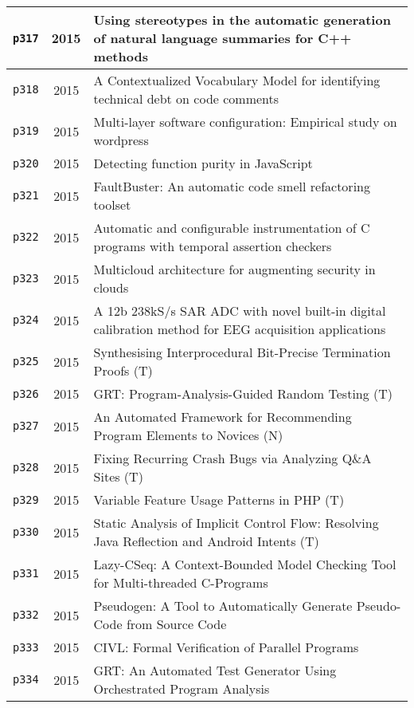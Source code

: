 \begin{longtable}{| c | c | p{16cm} |}
  \texttt{p317} & 2015 & Using stereotypes in the automatic generation of natural language summaries for C++ methods \\
  \hline
  \texttt{p318} & 2015 & A Contextualized Vocabulary Model for identifying technical debt on code comments \\
  \hline
  \texttt{p319} & 2015 & Multi-layer software configuration: Empirical study on wordpress \\
  \hline
  \texttt{p320} & 2015 & Detecting function purity in JavaScript \\
  \hline
  \texttt{p321} & 2015 & FaultBuster: An automatic code smell refactoring toolset \\
  \hline
  \texttt{p322} & 2015 & Automatic and configurable instrumentation of C programs with temporal assertion checkers \\
  \hline
  \texttt{p323} & 2015 & Multicloud architecture for augmenting security in clouds \\
  \hline
  \texttt{p324} & 2015 & A 12b 238kS/s SAR ADC with novel built-in digital calibration method for EEG acquisition applications \\
  \hline
  \texttt{p325} & 2015 & Synthesising Interprocedural Bit-Precise Termination Proofs (T) \\
  \hline
  \texttt{p326} & 2015 & GRT: Program-Analysis-Guided Random Testing (T) \\
  \hline
  \texttt{p327} & 2015 & An Automated Framework for Recommending Program Elements to Novices (N) \\
  \hline
  \texttt{p328} & 2015 & Fixing Recurring Crash Bugs via Analyzing Q\&A Sites (T) \\
  \hline
  \texttt{p329} & 2015 & Variable Feature Usage Patterns in PHP (T) \\
  \hline
  \texttt{p330} & 2015 & Static Analysis of Implicit Control Flow: Resolving Java Reflection and Android Intents (T) \\
  \hline
  \texttt{p331} & 2015 & Lazy-CSeq: A Context-Bounded Model Checking Tool for Multi-threaded C-Programs \\
  \hline
  \texttt{p332} & 2015 & Pseudogen: A Tool to Automatically Generate Pseudo-Code from Source Code \\
  \hline
  \texttt{p333} & 2015 & CIVL: Formal Verification of Parallel Programs \\
  \hline
  \texttt{p334} & 2015 & GRT: An Automated Test Generator Using Orchestrated Program Analysis \\

\end{longtable}
